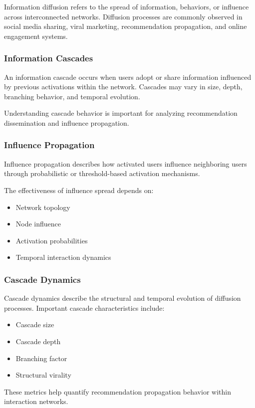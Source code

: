 \documentclass{article}
\begin{document}
Information diffusion refers to the spread of information, behaviors, or influence across interconnected networks. Diffusion processes are commonly observed in social media sharing, viral marketing, recommendation propagation, and online engagement systems.

\subsubsection{Information Cascades}

An information cascade occurs when users adopt or share information influenced by previous activations within the network. Cascades may vary in size, depth, branching behavior, and temporal evolution.

Understanding cascade behavior is important for analyzing recommendation dissemination and influence propagation.

\subsubsection{Influence Propagation}

Influence propagation describes how activated users influence neighboring users through probabilistic or threshold-based activation mechanisms.

The effectiveness of influence spread depends on:
\begin{itemize}
\item Network topology
\item Node influence
\item Activation probabilities
\item Temporal interaction dynamics
\end{itemize}

\subsubsection{Cascade Dynamics}

Cascade dynamics describe the structural and temporal evolution of diffusion processes. Important cascade characteristics include:
\begin{itemize}
\item Cascade size
\item Cascade depth
\item Branching factor
\item Structural virality
\end{itemize}

These metrics help quantify recommendation propagation behavior within interaction networks.
\end{document}
